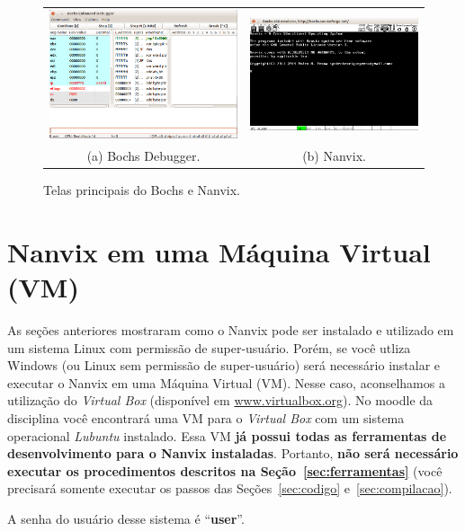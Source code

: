 \documentclass[11pt]{article}
\begin{document}
\begin{figure}[t]
	\centering
	\begin{tabular}{cc}
		\includegraphics[scale=0.3]{img/bochs.png} & 	\includegraphics[scale=0.33]{img/nanvix.png} \\
		(a) Bochs Debugger. & (b) Nanvix.
	\end{tabular}
	\caption{Telas principais do Bochs e Nanvix.}
	\label{fig:bochs}
\end{figure}

\section{Nanvix em uma Máquina Virtual (VM)}
\label{sec:vm}

As seções anteriores mostraram como o Nanvix pode ser instalado e
utilizado em um sistema Linux com permissão de super-usuário. Porém, se
você utliza Windows (ou Linux sem permissão de super-usuário) será
necessário instalar e executar o Nanvix em uma Máquina Virtual (VM).
Nesse caso, aconselhamos a utilização do \textit{Virtual Box}
(disponível em \url{www.virtualbox.org}). No moodle da disciplina você encontrará uma VM para o \textit{Virtual Box} com um sistema operacional \textit{Lubuntu} instalado. Essa VM \textbf{já possui todas as ferramentas de desenvolvimento para o Nanvix instaladas}. Portanto, \textbf{não será necessário executar os procedimentos descritos na Seção~\ref{sec:ferramentas}} (você precisará somente executar os passos das Seções~\ref{sec:codigo} e~\ref{sec:compilacao}).

A senha do usuário desse sistema é ``\textbf{user}''.
\end{document}
